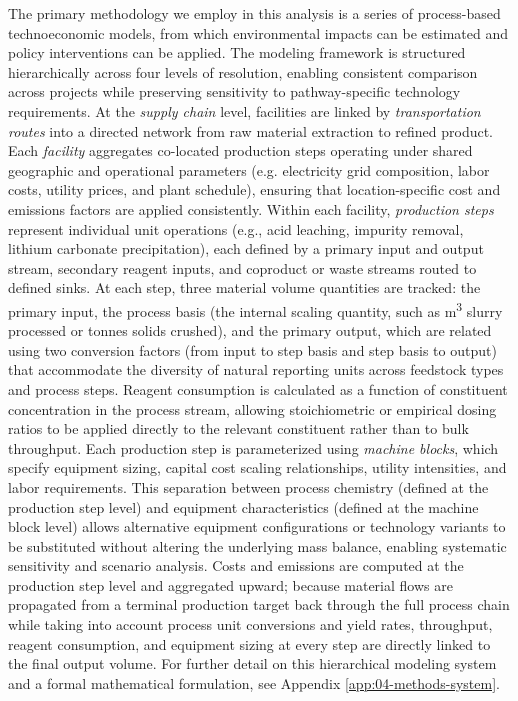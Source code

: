 \documentclass{article}
\renewcommand\_{\textunderscore\allowbreak}
\begin{document}
The primary methodology we employ in this analysis is a series of process-based technoeconomic models, from which environmental impacts can be estimated and policy interventions can be applied. The modeling framework is structured hierarchically across four levels of resolution, enabling consistent comparison across projects while preserving sensitivity to pathway-specific technology requirements. At the \textit{supply chain} level, facilities are linked by \textit{transportation routes} into a directed network from raw material extraction to refined  product. Each \textit{facility} aggregates co-located production steps operating under shared geographic and operational parameters (e.g. electricity grid composition, labor costs, utility prices, and plant schedule), ensuring that location-specific cost and emissions factors are applied consistently. Within each facility, \textit{production steps} represent individual unit operations (e.g., acid leaching, impurity removal, lithium carbonate precipitation), each defined by a primary input and output stream, secondary reagent inputs, and coproduct or waste streams routed to defined sinks. At each step, three material volume quantities are tracked: the primary input, the process basis (the internal scaling quantity, such as \si{m^3} slurry processed or tonnes solids crushed), and the primary output, which are related using two conversion factors (from input to step basis and step basis to output) that accommodate the diversity of natural reporting units across feedstock types and process steps. Reagent consumption is calculated as a function of constituent concentration in the process stream, allowing stoichiometric or empirical dosing ratios to be applied directly to the relevant constituent rather than to bulk throughput. Each production step is parameterized using \textit{machine blocks}, which specify equipment sizing, capital cost scaling relationships, utility intensities, and labor requirements. This separation between process chemistry (defined at the production step level) and equipment characteristics (defined at the machine block level) allows alternative equipment configurations or technology variants to be substituted without altering the underlying mass balance, enabling systematic sensitivity and scenario analysis. Costs and emissions are computed at the production step level and aggregated upward; because material flows are propagated from a terminal production target back through the full process chain while taking into account process unit conversions and yield rates, throughput, reagent consumption, and equipment sizing at every step are directly linked to the final output volume. For further detail on this hierarchical modeling system and a formal mathematical formulation, see Appendix \ref{app:04-methods-system}. 
\end{document}
